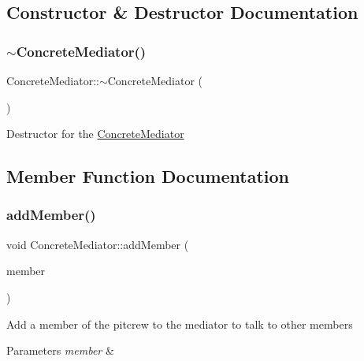 \subsection{Constructor \& Destructor Documentation}
\mbox{\label{class_concrete_mediator_a62241708f7b293eafb48064e0dd22f2f}} 
\subsubsection{\texorpdfstring{$\sim$\+Concrete\+Mediator()}{~ConcreteMediator()}}
{\footnotesize\ttfamily Concrete\+Mediator\+::$\sim$\+Concrete\+Mediator (\begin{DoxyParamCaption}{ }\end{DoxyParamCaption})}

Destructor for the \mbox{\hyperlink{class_concrete_mediator}{Concrete\+Mediator}} 

\subsection{Member Function Documentation}
\mbox{\label{class_concrete_mediator_a81de115027a7180658925a2d2175e08f}} 
\subsubsection{\texorpdfstring{add\+Member()}{addMember()}}
{\footnotesize\ttfamily void Concrete\+Mediator\+::add\+Member (\begin{DoxyParamCaption}\item[{\mbox{\hyperlink{class_pit_crew}{Pit\+Crew}} $\ast$}]{member }\end{DoxyParamCaption})\hspace{0.3cm}{\ttfamily [virtual]}}

Add a member of the pitcrew to the mediator to talk to other members 
\begin{DoxyParams}{Parameters}
{\em member} & \\
\hline
\end{DoxyParams}


